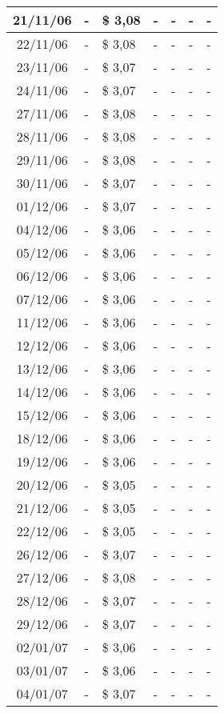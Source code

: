 \begin{center}
\begin{longtable}{|c|p{1.5cm}|p{1.5cm}|p{1.5cm}|p{1.5cm}|p{1.5cm}|p{1.5cm}|}
21/11/06 & - & \$ 3,08 & - & - & - & - \\ \hline
22/11/06 & - & \$ 3,08 & - & - & - & - \\ \hline
23/11/06 & - & \$ 3,07 & - & - & - & - \\ \hline
24/11/06 & - & \$ 3,07 & - & - & - & - \\ \hline
27/11/06 & - & \$ 3,08 & - & - & - & - \\ \hline
28/11/06 & - & \$ 3,08 & - & - & - & - \\ \hline
29/11/06 & - & \$ 3,08 & - & - & - & - \\ \hline
30/11/06 & - & \$ 3,07 & - & - & - & - \\ \hline
01/12/06 & - & \$ 3,07 & - & - & - & - \\ \hline
04/12/06 & - & \$ 3,06 & - & - & - & - \\ \hline
05/12/06 & - & \$ 3,06 & - & - & - & - \\ \hline
06/12/06 & - & \$ 3,06 & - & - & - & - \\ \hline
07/12/06 & - & \$ 3,06 & - & - & - & - \\ \hline
11/12/06 & - & \$ 3,06 & - & - & - & - \\ \hline
12/12/06 & - & \$ 3,06 & - & - & - & - \\ \hline
13/12/06 & - & \$ 3,06 & - & - & - & - \\ \hline
14/12/06 & - & \$ 3,06 & - & - & - & - \\ \hline
15/12/06 & - & \$ 3,06 & - & - & - & - \\ \hline
18/12/06 & - & \$ 3,06 & - & - & - & - \\ \hline
19/12/06 & - & \$ 3,06 & - & - & - & - \\ \hline
20/12/06 & - & \$ 3,05 & - & - & - & - \\ \hline
21/12/06 & - & \$ 3,05 & - & - & - & - \\ \hline
22/12/06 & - & \$ 3,05 & - & - & - & - \\ \hline
26/12/06 & - & \$ 3,07 & - & - & - & - \\ \hline
27/12/06 & - & \$ 3,08 & - & - & - & - \\ \hline
28/12/06 & - & \$ 3,07 & - & - & - & - \\ \hline
29/12/06 & - & \$ 3,07 & - & - & - & - \\ \hline
02/01/07 & - & \$ 3,06 & - & - & - & - \\ \hline
03/01/07 & - & \$ 3,06 & - & - & - & - \\ \hline
04/01/07 & - & \$ 3,07 & - & - & - & - \\ \hline

\end{longtable}
\end{center}
